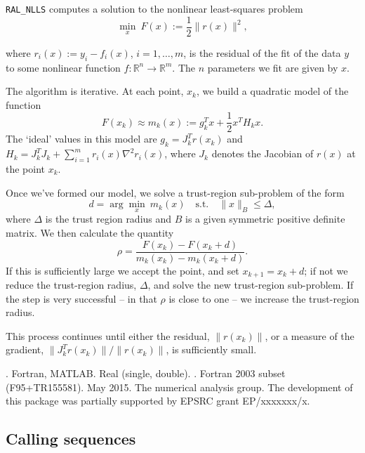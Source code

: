 \documentclass{hslspec}
\newcommand{\libraryname}{RAL}
\newcommand{\packagename}{NLLS}
\newcommand{\fullpackagename}{\libraryname\_\packagename}
\newcommand{\versionum}{1.0.0}
\newcommand{\versiondate}{xx xx 20xx}
\begin{document}
\hslheader

\hslsummary
{\tt \fullpackagename} computes a solution to the nonlinear least-squares problem
\begin{equation}
\min_{x} \  F(x) := \frac{1}{2}\| r(x) \|^2,
\label{eq:nlls_problem}
\end{equation}

where $r_i(x) := y_i - f_i(x)$, $i = 1,\dots,m$, is the residual of the fit of the data $y$ to some nonlinear function $f : \mathbb{R}^n \rightarrow \mathbb{R}^m$.  The $n$ parameters we fit are given by $x$.

The algorithm is iterative.
At each point, $x_k$, we build a quadratic model of the function
\[
F(x_k) \approx m_k(x) := g_k^T x + \frac{1}{2} x^T H_k x.
\]
The `ideal' values in this model are $g_k = J_k^Tr(x_k)$ and $H_k = J_k^TJ_k + \sum_{i = 1}^m r_i(x) \nabla^2 r_i(x)$, where $J_k$ denotes the Jacobian of $r(x)$ at the point $x_k$.

Once we've formed our model, we solve a trust-region sub-problem of the form
\[
d = \arg \min_{x} \ m_k(x) \quad \mathrm{s.t.} \quad  \|x\|_B \leq \Delta,
\]
where $\Delta$ is the trust region radius and $B$ is a given symmetric positive definite matrix. 
We then calculate the quantity
\[\rho = \frac{F(x_k) - F(x_k + d)}{m_k(x_k) - m_k(x_k + d)}.\]
If this is sufficiently large we accept the point, and set $x_{k+1} = x_k + d$; if not we reduce the trust-region radius, $\Delta$, and solve the new trust-region sub-problem.  If the step is very successful -- in that $\rho$ is close to one -- we increase the trust-region radius.

This process continues until either the residual, $\|r(x_k)\|$, or a measure of the gradient,
$\|J_k^Tr(x_k)\| / \|r(x_k)\|$, is sufficiently small.


\hslattributes
\hslversions{\versionum\ ({\color{red}\versiondate)}}.
\hslinterfaces Fortran, MATLAB.
\hslIRDCZ Real (single, double).
.
\hsllanguage Fortran 2003 subset (F95+TR155581).  
\hsldate May 2015. 
\hslorigin The numerical analysis group.
\hslremark The development of this package was 
partially supported by EPSRC grant {\color{red}EP/xxxxxxx/x}.

\newpage
\hslhowto

\subsection{Calling sequences}
\end{document}
